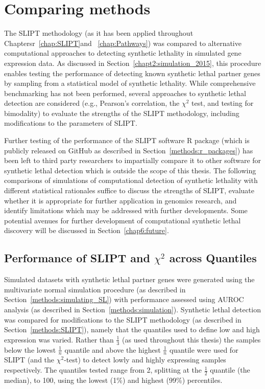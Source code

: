 \section{Comparing methods} \label{chap5:compare_ methods}

The \gls{SLIPT} methodology (as it has been applied throughout Chaptersr~\ref{chap:SLIPT}and ~\ref{chap:Pathways}) was compared to alternative computational approaches to detecting synthetic lethality in simulated gene expression data. As discussed in Section~\ref{chapt2:simulation_2015}, this procedure enables testing the performance of detecting known synthetic lethal partner genes by sampling from a statistical model of synthetic lethality. While comprehensive benchmarking has not been performed, several approaches to synthetic lethal detection are considered (e.g., Pearson's correlation, the $\chi^2$ test, and testing for bimodality) to evaluate the strengths of the SLIPT methodology, including modifications to the parameters of \gls{SLIPT}.

Further testing of the performance of the SLIPT software R package (which is publicly released on GitHub as described in Section~\ref{methods:r_packages}) has been left to third party researchers to impartially compare it to other software for synthetic lethal detection which is outside the scope of this thesis. The following comparisons of simulations of computational detection of synthetic lethality with different statistical rationales suffice to discuss the strengths of \gls{SLIPT}, evaluate whether it is appropriate for further application in genomics research, and identify limitations which may be addressed with further developments. Some potential avenues for further development of computational synthetic lethal discovery will be discussed in Section~\ref{chap6:future}.

\subsection{Performance of SLIPT and $\chi^2$ across Quantiles}
\label{chap5:compare_chisq}

Simulated datasets with synthetic lethal partner genes were generated using the multivariate normal simulation procedure (as described in Section~\ref{methods:simulating_SL}) with performance assessed using \gls{AUROC} analysis (as described in Section~\ref{methods:simulation}). Synthetic lethal detection was compared for modifications to the \gls{SLIPT} methodology (as described in Section~\ref{methods:SLIPT}), namely that the quantiles used to define low and high expression was varied. Rather than $\frac{1}{3}$ (as used throughout this thesis) the samples below the lowest $\frac{1}{n}$ quantile and above the highest $\frac{1}{n}$ quantile were used for \gls{SLIPT} (and the $\chi^2$-test) to detect lowly and highly expressing samples respectively. The quantiles tested range from 2, splitting at the $\frac{1}{2}$ quantile (the median), to 100, using the lowest (1\%) and highest (99\%) percentiles.

